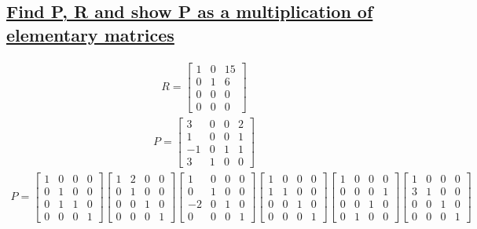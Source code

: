 \documentclass[a4paper, 12pt]{article}
\newcommand{\sub}[1]{\subsection{\underline{#1}}}
\newcommand{\eq}[1]{\begin{align*}#1\end{align*}}
\begin{document}
\setcounter{section}{4}
\setcounter{subsection}{2}
\sub{Find P, R and show P as a multiplication of elementary matrices}
\eq{
    R=\begin{bmatrix}
        1&0&15\\
        0&1&6\\
        0&0&0\\
        0&0&0
    \end{bmatrix}
}
\eq{
    P=\begin{bmatrix}
        3&0&0&2\\
        1&0&0&1\\
        -1&0&1&1\\
        3&1&0&0
    \end{bmatrix}
}
\eq{
    P=
    \begin{bmatrix}
        1&0&0&0\\
        0&1&0&0\\
        0&1&1&0\\
        0&0&0&1
    \end{bmatrix}
    \begin{bmatrix}
        1&2&0&0\\
        0&1&0&0\\
        0&0&1&0\\
        0&0&0&1
    \end{bmatrix}
    \begin{bmatrix}
        1&0&0&0\\
        0&1&0&0\\
        -2&0&1&0\\
        0&0&0&1
    \end{bmatrix}
    \begin{bmatrix}
        1&0&0&0\\
        1&1&0&0\\
        0&0&1&0\\
        0&0&0&1
    \end{bmatrix}
    \begin{bmatrix}
        1&0&0&0\\
        0&0&0&1\\
        0&0&1&0\\
        0&1&0&0
    \end{bmatrix}
    \begin{bmatrix}
        1&0&0&0\\
        3&1&0&0\\
        0&0&1&0\\
        0&0&0&1
    \end{bmatrix}
}
\end{document}
